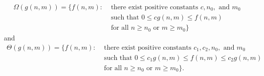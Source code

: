 \begin{equation*}
  \begin{split}
    \Omega(g(n, m)) = \lbrace f(n, m) : &\text{ there exist positive constants }
    c, n_0, \text{ and } m_0 \\
    &\text{ such that }
    0 \leq c g(n, m) \leq f(n, m) \\
    &\text{ for all } n \geq n_0 \text{ or }
    m \geq m_0 \rbrace
  \end{split}
\end{equation*}
and
\begin{equation*}
  \begin{split}
    \Theta(g(n, m)) = \lbrace f(n, m) : &\text{ there exist positive constants }
    c_1, c_2, n_0, \text{ and } m_0 \\
    &\text{ such that }
    0 \leq c_1 g(n, m) \leq f(n, m) \leq c_2 g(n, m) \\
    &\text{ for all } n \geq n_0 \text{ or }
    m \geq m_0 \rbrace.
  \end{split}
\end{equation*}
